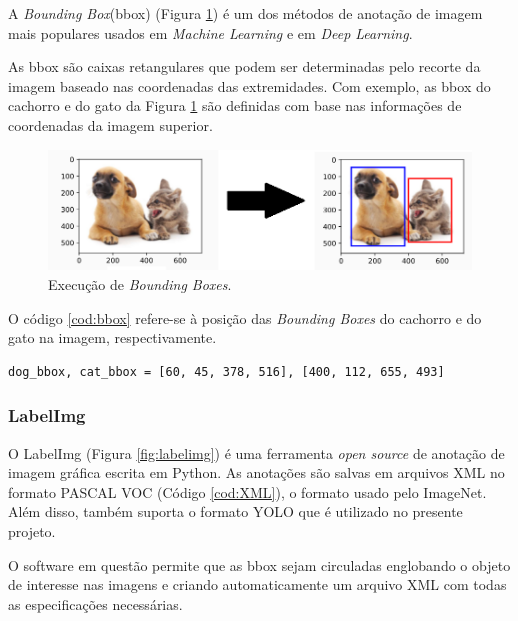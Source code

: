 A \textit{Bounding Box}(bbox) (Figura \ref{fig:boundingBox}) é um dos métodos de anotação de imagem mais populares usados em \textit{Machine Learning} e em \textit{Deep Learning}.

As bbox são caixas retangulares que podem ser determinadas pelo recorte da imagem baseado nas coordenadas das extremidades. Com exemplo, as bbox do cachorro e do gato da Figura \ref{fig:boundingBox} são definidas com base nas informações de coordenadas da imagem superior. \cite{allDeep}

\begin{figure}[H]
		\centering
		\includegraphics[scale=0.6]{figuras/MachineLearning/catDog.png}
		\caption{Execução de \textit{Bounding Boxes}.}
		\label{fig:boundingBox}
\end{figure}

O código \ref{cod:bbox} refere-se à posição das \textit{Bounding Boxes} do cachorro e do gato na imagem, respectivamente.

\begin{lstlisting}[caption=Posições de X e Y nas \textit{Bounding Boxes}, label=cod:bbox]
         dog_bbox, cat_bbox = [60, 45, 378, 516], [400, 112, 655, 493]
\end{lstlisting}


\subsubsection*{LabelImg}\label{sub:LabelImg}

O LabelImg (Figura \ref{fig:labelimg}) é uma ferramenta \textit{open source} de anotação de imagem gráfica escrita em Python. As anotações são salvas em arquivos XML no formato PASCAL VOC (Código \ref{cod:XML}), o formato usado pelo ImageNet. Além disso, também suporta o formato YOLO que é utilizado no presente projeto. \cite{labelimg}

O software em questão permite que as bbox sejam circuladas englobando o objeto de interesse nas imagens e criando automaticamente um arquivo XML com todas as especificações necessárias.

